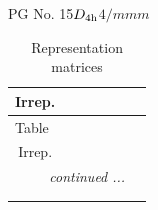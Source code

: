 \documentclass[fleqn,8pt,landscape]{jsarticle}
\begin{document}
\setcounter{MaxMatrixCols}{32}

\renewcommand{\tablename}{Table~}
\renewcommand{\figurename}{Figure~}
\begin{center}
\LARGE
PG No. 15\quad$D_{\rm 4h}$\quad$4/mmm$\quad[ tetragonal ]
\end{center}
\renewcommand{\arraystretch}{1.2}
\begin{longtable}{ccccccc}
\caption{Representation matrices}
 \\
 \hline \hline
Irrep. &  &  &  &  &  &  \\ \hline \endfirsthead

\multicolumn{6}{l}{\tablename\ \thetable{}} \\
 \hline \hline
Irrep. &  &  &  &  &  &  \\ \hline \endhead

 \hline \hline
\multicolumn{6}{r}{\footnotesize\it continued ...} \\ \endfoot

 \hline \hline
\multicolumn{6}{r}{} \\ \endlastfoot


\end{longtable}
\end{document}

